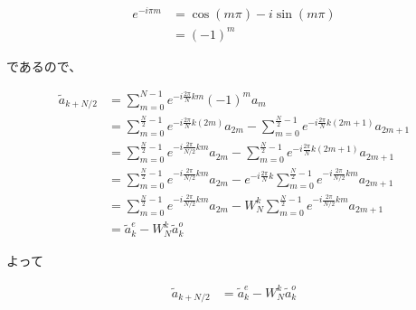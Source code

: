 \begin{align*}
    e^{-i\pi m} &= \cos(m\pi) - i\sin(m\pi)\\
                &= (-1)^m
\end{align*}

であるので、

\begin{align*}
    \tilde{a}_{k + N/2} &= \sum_{m = 0}^{N - 1} e^{-i\frac{2\pi}{N}km} (-1)^m a_m \\
                        &= \sum_{m = 0}^{\frac{N}{2} - 1} e^{-i\frac{2\pi}{N}k(2m)} a_{2m} 
                         - \sum_{m = 0}^{\frac{N}{2} - 1} e^{-i\frac{2\pi}{N}k(2m + 1)} a_{2m + 1} \\
                        &= \sum_{m = 0}^{\frac{N}{2} - 1} e^{-i\frac{2\pi}{N / 2}km} a_{2m} 
                         - \sum_{m = 0}^{\frac{N}{2} - 1} e^{-i\frac{2\pi}{N}k(2m + 1)} a_{2m + 1} \\
                        &= \sum_{m = 0}^{\frac{N}{2} - 1} e^{-i\frac{2\pi}{N / 2}km} a_{2m} 
                         - e^{-i\frac{2\pi}{N}k} \sum_{m = 0}^{\frac{N}{2} - 1} e^{-i\frac{2\pi}{N / 2}km} a_{2m + 1} \\
                        &= \sum_{m = 0}^{\frac{N}{2} - 1} e^{-i\frac{2\pi}{N / 2}km} a_{2m} 
                         - W_N^k \sum_{m = 0}^{\frac{N}{2} - 1} e^{-i\frac{2\pi}{N / 2}km} a_{2m + 1} \\
                        &= \tilde{a}_k^{e} - W_N^k \tilde{a}_k^{o}
\end{align*}

よって

\begin{align}
    \tilde{a}_{k + N/2} &= \tilde{a}_k^{e} - W_N^k \tilde{a}_k^{o}
\end{align}
